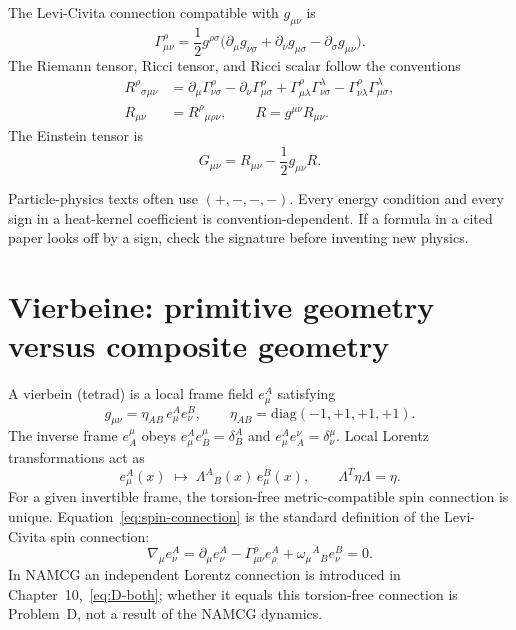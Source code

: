 The Levi-Civita connection compatible with \(g_{\mu\nu}\) is
\begin{equation}
  \label{eq:christoffel}
  \Gamma^\rho_{\mu\nu}
  =\frac12 g^{\rho\sigma}
  \bigl(\partial_\mu g_{\nu\sigma}+\partial_\nu g_{\mu\sigma}
        -\partial_\sigma g_{\mu\nu}\bigr).
\end{equation}
The Riemann tensor, Ricci tensor, and Ricci scalar follow the
conventions
\begin{equation}
  \label{eq:riemann}
  \begin{aligned}
    R^\rho{}_{\sigma\mu\nu}
    &=\partial_\mu\Gamma^\rho_{\nu\sigma}
      -\partial_\nu\Gamma^\rho_{\mu\sigma}
      +\Gamma^\rho_{\mu\lambda}\Gamma^\lambda_{\nu\sigma}
      -\Gamma^\rho_{\nu\lambda}\Gamma^\lambda_{\mu\sigma},\\
    R_{\mu\nu}&=R^\rho{}_{\mu\rho\nu},\qquad
    R=g^{\mu\nu}R_{\mu\nu}.
  \end{aligned}
\end{equation}
The Einstein tensor is
\begin{equation}
  \label{eq:einstein-tensor}
  G_{\mu\nu}=R_{\mu\nu}-\frac12 g_{\mu\nu}R.
\end{equation}

\begin{remark}
  Particle-physics texts often use \((+,-,-,-)\). Every energy
  condition and every sign in a heat-kernel coefficient is
  convention-dependent. If a formula in a cited paper looks off by a
  sign, check the signature before inventing new physics.
\end{remark}

\section{Vierbeine: primitive geometry versus composite geometry}
\label{sec:ch2-vierbein}

A vierbein (tetrad) is a local frame field \(e^A_\mu\) satisfying
\begin{equation}
  \label{eq:vierbein-def}
  g_{\mu\nu}=\eta_{AB}\,e^A_\mu e^B_\nu,\qquad
  \eta_{AB}=\mathrm{diag}(-1,+1,+1,+1).
\end{equation}
The inverse frame \(e^\mu_A\) obeys
\(e^A_\mu e^\mu_B=\delta^A_B\) and
\(e^A_\mu e^\nu_A=\delta^\mu_\nu\). Local Lorentz transformations act
as
\begin{equation}
  \label{eq:local-lorentz}
  e^A_\mu(x)\;\longmapsto\;
  \Lambda^A{}_B(x)\,e^B_\mu(x),
  \qquad
  \Lambda^T\eta\Lambda=\eta.
\end{equation}
For a given invertible frame, the torsion-free metric-compatible
spin connection is unique. Equation~\eqref{eq:spin-connection} is
the standard definition of the Levi-Civita spin connection:
\begin{equation}
  \label{eq:spin-connection}
  \nabla_\mu e^A_\nu
  =\partial_\mu e^A_\nu-\Gamma^\rho_{\mu\nu}e^A_\rho
   +\omega_\mu{}^A{}_B e^B_\nu=0.
\end{equation}
In NAMCG an independent Lorentz connection is introduced in
Chapter~10,~\eqref{eq:D-both}; whether it equals this torsion-free
connection is Problem~D, not a result of the NAMCG dynamics.

